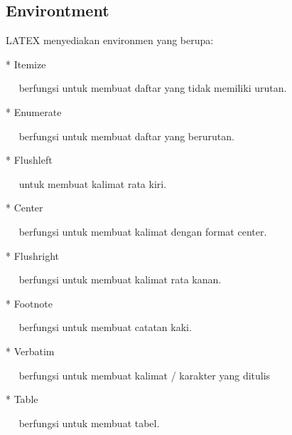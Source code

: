 \subsection{Environtment} \par
LATEX menyediakan environmen yang berupa: \par
* Itemize \par
~~ berfungsi untuk membuat daftar yang tidak memiliki urutan. \par
* Enumerate \par
~~ berfungsi untuk membuat daftar yang berurutan. \par
* Flushleft \par
~~ untuk membuat kalimat rata kiri. \par
* Center \par
~~ berfungsi untuk membuat kalimat dengan format center. \par
* Flushright \par
~~ berfungsi untuk membuat kalimat rata kanan. \par
* Footnote \par
~~ berfungsi untuk membuat catatan kaki. \par
* Verbatim \par
~~ berfungsi untuk membuat kalimat / karakter yang ditulis \par
* Table
 \par
~~ berfungsi untuk membuat tabel.  \par 
